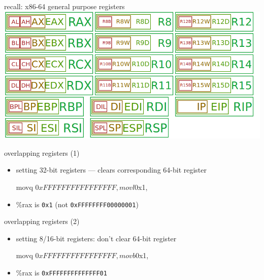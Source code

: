 \begin{frame}{recall: x86-64 general purpose registers}
\includegraphics[width=\textwidth]{../asm/x86-gprs}
\end{frame}

\begin{frame}[fragile,label=overlapEx]{overlapping registers (1)}
    \begin{itemize}
    \item setting 32-bit registers --- clears corresponding 64-bit register
\begin{asmcodeNL}
movq $0xFFFFFFFFFFFFFFFF, %
movl $0x1, %
\end{asmcodeNL}
        \item \%rax is {\tt 0x1} ({\small not {\tt 0xFFFFFFFF00000001}})
    \end{itemize}
\end{frame}
\begin{frame}[fragile,label=overlapEx2]{overlapping registers (2)}
\begin{itemize}
    \item setting 8/16-bit registers: don't clear 64-bit register
\begin{asmcodeNL}
movq $0xFFFFFFFFFFFFFFFF, %
movb $0x1, %
\end{asmcodeNL}
    \item \%rax is {\tt 0xFFFFFFFFFFFFFF01}
\end{itemize}
\end{frame}

